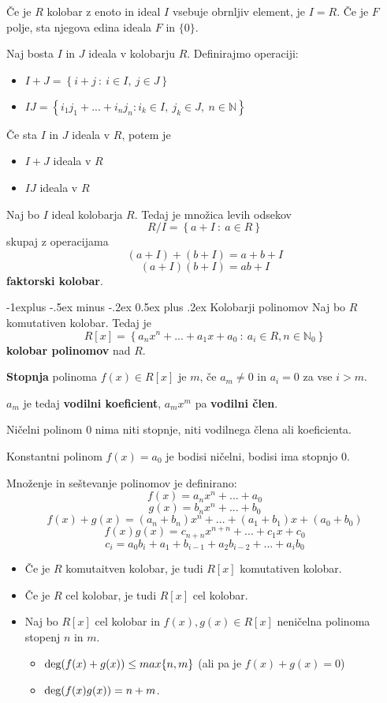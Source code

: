 \documentclass[a4paper,8pt]{extarticle}
\makeatletter
\renewcommand{\subsection}{\@startsection{subsection}{2}{0mm}%
                                {-1explus -.5ex minus -.2ex}%
                                {0.5ex plus .2ex}%
                                {\normalfont\normalsize\bfseries}}
\makeatother
\begin{document}
\begin{multicols}{4}
Če je $R$ kolobar z enoto in ideal $I$ vsebuje obrnljiv element, je $I = R$.
Če je $F$ polje, sta njegova edina ideala $F$ in $\{0\}$.


Naj bosta $I$ in $J$ ideala v kolobarju $R$. Definirajmo operaciji:
\begin{itemize}
    \item $I+J = \left\{ i+j\ :\ i \in I,\ j\in J \right\}$
    \item $IJ = \left\{i_1j_1 + ... + i_nj_n : i_k \in I,\ j_k \in J,\ n \in \mathbb{N}\right\}$
\end{itemize}
Če sta $I$ in $J$ ideala v $R$, potem je
\begin{itemize}
    \item $I+J$ ideala v $R$
    \item $IJ$ ideala v $R$
\end{itemize}

Naj bo $I$ ideal kolobarja $R$. Tedaj je množica levih odsekov
\[R/I = \left\{ a+I\ :\ a \in R \right\}\]
skupaj z operacijama
\[(a+I) + (b+I) = a+b+I\]
\[(a+I)(b+I) = ab+I\]
\textbf{faktorski kolobar}.

\subsection{Kolobarji polinomov}
Naj bo $R$ komutativen kolobar. Tedaj je
\[R[x] = \left\{ a_nx^n + ... + a_1x + a_0\ :\ a_i \in R, n \in \mathbb{N}_0 \right\}\]
\textbf{kolobar polinomov} nad $R$.

\textbf{Stopnja} polinoma $f(x) \in R[x]$ je $m$, če $a_m \neq 0$ in $a_i = 0$ za vse $i>m$.

$a_m$ je tedaj \textbf{vodilni koeficient}, $a_mx^m$ pa \textbf{vodilni člen}.

Ničelni polinom $0$ nima niti stopnje, niti vodilnega člena ali koeficienta.

Konstantni polinom $f(x) = a_0$ je bodisi ničelni, bodisi ima stopnjo $0$.

Množenje in seštevanje polinomov je definirano:
\[f(x) = a_nx^n + ... + a_0\]
\[g(x) = b_nx^n + ... + b_0\]
\[f(x)+g(x) = (a_n+b_n)x^n + ... + (a_1 + b_1)x + (a_0 + b_0)\]
\[f(x)g(x) = c_{n+n}x^{n+n} + ... + c_1x + c_0 \]
\[c_i = a_0b_i + a_1+b_{i-1} + a_2b_{i-2} + ... + a_ib_0\]
\begin{itemize}
    \item Če je $R$ komutaitven kolobar, je tudi $R[x]$ komutativen kolobar.
    \item Če je $R$ cel kolobar, je tudi $R[x]$ cel kolobar.
    \item Naj bo $R[x]$ cel kolobar in $f(x),g(x) \in R[x]$ neničelna polinoma stopenj $n$ in $m$.
    \begin{itemize}
        \item $\textmd{deg}(f(x)+g(x)) \leq max\{n,m\}$ (ali pa je $f(x)+g(x) = 0$)
        \item $\textmd{deg}(f(x)g(x)) = n+m$.
    \end{itemize}
\end{itemize}


\end{multicols}
\end{document}
